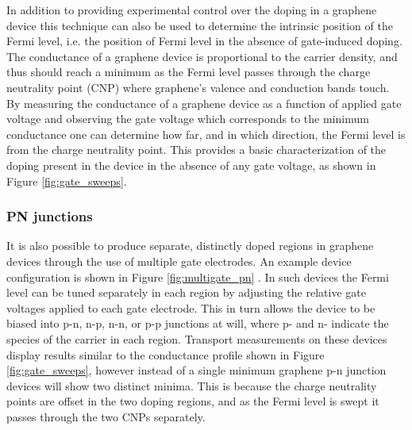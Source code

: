 \documentclass[edeposit,fullpage,draftthesis]{uiucthesis2009}
\begin{document}
        In addition to providing experimental control over the doping
        in a graphene device this technique can also be used to determine the intrinsic 
        position of the Fermi level, i.e. the position of Fermi level in the absence of gate-induced doping. 
        The conductance of a graphene device is proportional to the carrier density, and thus should
        reach a minimum as the Fermi level passes through the charge neutrality point (CNP) where
        graphene's valence and conduction bands touch. By measuring the conductance of a graphene
        device as a function of applied gate voltage and observing the gate voltage which corresponds
        to the minimum conductance
        one can determine how far, and in which direction, the Fermi level
        is from the charge neutrality point. This provides a basic characterization
        of the doping present in the device in the absence of any gate voltage, as shown in Figure
        \ref{fig:gate_sweeps}.
       
        \subsubsection*{PN junctions}
        
        It is also possible to produce separate, distinctly doped regions in
        graphene devices through the use of multiple gate electrodes. An example device configuration
        is shown in Figure \ref{fig:multigate_pn} \cite{williams2007quantum}. In such devices
        the Fermi level can be tuned separately in each region by adjusting the relative
        gate voltages applied to each gate electrode. This in turn allows the device to
        be biased into p-n, n-p, n-n, or p-p junctions at will, where p- and n- indicate
        the species of the carrier in each region. 
        Transport measurements on these devices display results
        similar to the conductance profile shown in Figure \ref{fig:gate_sweeps}, however
        instead of a single minimum graphene p-n junction devices will show two distinct
        minima. This is because the charge neutrality points are offset in the two doping
        regions, and as the Fermi level is swept it passes through the two CNPs separately.
        
\end{document}
